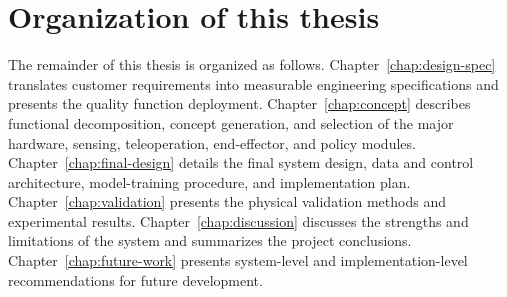 \section{Organization of this thesis}

The remainder of this thesis is organized as follows.
Chapter~\ref{chap:design-spec} translates customer requirements into measurable engineering specifications and presents the quality function deployment.
Chapter~\ref{chap:concept} describes functional decomposition, concept generation, and selection of the major hardware, sensing, teleoperation, end-effector, and policy modules.
Chapter~\ref{chap:final-design} details the final system design, data and control architecture, model-training procedure, and implementation plan.
Chapter~\ref{chap:validation} presents the physical validation methods and experimental results.
Chapter~\ref{chap:discussion} discusses the strengths and limitations of the system and summarizes the project conclusions.
Chapter~\ref{chap:future-work} presents system-level and implementation-level recommendations for future development.
